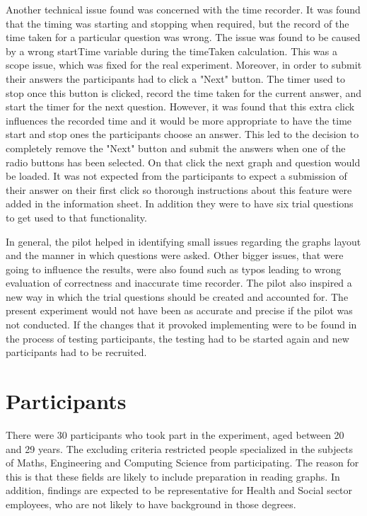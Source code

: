 \documentclass{l4proj}
\begin{document}
Another technical issue found was concerned with the time recorder. It was found that the timing was starting and stopping when required, but the record of the time taken for a particular question was wrong. The issue was found to be caused by a wrong startTime variable during the timeTaken calculation. This was a scope issue, which was fixed for the real experiment. Moreover, in order to submit their answers the participants had to click a "Next" button. The timer used to stop once this button is clicked, record the time taken for the current answer, and start the timer for the next question. However, it was found that this extra click influences the recorded time and it would be more appropriate to have the time start and stop ones the participants choose an answer. This led to the decision to completely remove the "Next" button and submit the answers when one of the radio buttons has been selected. On that click the next graph and question would be loaded. It was not expected from the participants to expect a submission of their answer on their first click so thorough instructions about this feature were added in the information sheet. In addition they were to have six trial questions to get used to that functionality. 
 
In general, the pilot helped in identifying small issues regarding the graphs layout and the manner in which questions were asked. Other bigger issues, that were going to influence the results, were also found such as typos leading to wrong evaluation of correctness and inaccurate time recorder. The pilot also inspired a new way in which the trial questions should be created and accounted for. The present experiment would not have been as accurate and precise if the pilot was not conducted. If the changes that it provoked implementing were to be found in the process of testing participants, the testing had to be started again and new participants had to be recruited.

\section{Participants}
There were 30 participants who took part in the experiment, aged between 20 and 29 years. The excluding criteria restricted people specialized in the subjects of Maths, Engineering and Computing Science from participating. The reason for this is that these fields are likely to include preparation in reading graphs. In addition, findings are expected to be representative for Health and Social sector employees, who are not likely to have background in those degrees.
\end{document}
